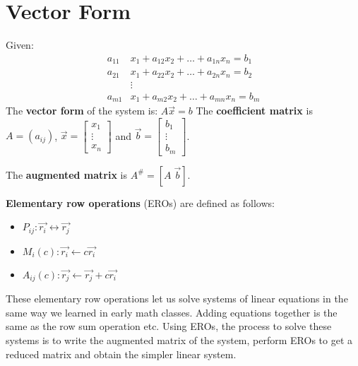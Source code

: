 \documentclass[../main.tex]{subfiles}
\begin{document}
\section{Vector Form}

Given:
\begin{align*}
    a_{11}&x_1 + a_{12}x_2 + \dots + a_{1n}x_n = b_1 \\
    a_{21}&x_1 + a_{22}x_2 + \dots + a_{2n}x_n = b_2 \\
    & \vdots \\
    a_{m1}&x_1 + a_{m2}x_2 + \dots + a_{mn}x_n = b_m
\end{align*}
The \textbf{vector form} of the system is: \( A \vec{x} = b \)
The \textbf{coefficient matrix} is \( A = \left( a_{ij} \right) \),
\( \vec{x} = \begin{bmatrix}
    x_1 \\
    \vdots \\
    x_n
\end{bmatrix} \)
and 
\( \vec{b} = \begin{bmatrix}
    b_1 \\
    \vdots \\
    b_m
\end{bmatrix} \).

The \textbf{augmented matrix} is \( A^\# = \left[ A \; \vec{b}\right]\).

\begin{definition}
    \textbf{Elementary row operations} (EROs) are defined as follows:
    \begin{itemize}
        \item \( P_{ij}: \vec{r_i} \leftrightarrow \vec{r_j} \)
        \item \( M_i(c): \vec{r_i} \leftarrow c \vec{r_i} \)
        \item \( A_{ij}(c): \vec{r_j} \leftarrow \vec{r_j} + c\vec{r_i} \)
    \end{itemize}
\end{definition}

These elementary row operations let us solve systems of linear equations in the same way we learned in early math classes.
Adding equations together is the same as the row sum operation etc.
Using EROs, the process to solve these systems is to write the augmented matrix of the system,
perform EROs to get a reduced matrix and obtain the simpler linear system.
\end{document}
